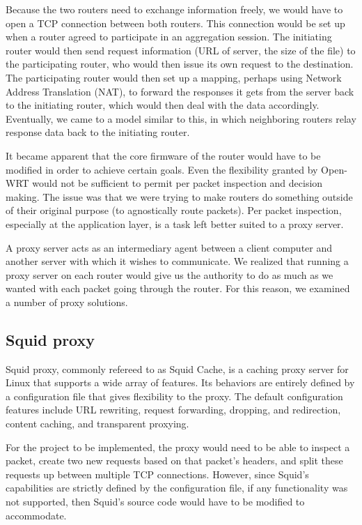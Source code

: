 \documentclass[12pt]{article}
\begin{document}
		Because the two routers need to exchange information freely, we would have to open a TCP connection between both routers. This connection would be set up when a router agreed to participate in an aggregation session. The initiating router would then send request information (URL of server, the size of the file) to the participating router, who would then issue its own request to the destination. The participating router would then set up a mapping, perhaps using Network Address Translation (NAT), to forward the responses it gets from the server back to the initiating router, which would then deal with the data accordingly. Eventually, we came to a model similar to this, in which neighboring routers relay response data back to the initiating router.

		It became apparent that the core firmware of the router would have to be modified in order to achieve certain goals. Even the flexibility granted by Open-WRT would not be sufficient to permit per packet inspection and decision making. The issue was that we were trying to make routers do something outside of their original purpose (to agnostically route packets). Per packet inspection, especially at the application layer, is a task left better suited to a proxy server.




		A proxy server acts as an intermediary agent between a client computer and another server with which it wishes to communicate. We realized that running a proxy server on each router would give us the authority to do as much as we wanted with each packet going through the router. For this reason, we examined a number of proxy solutions. 

		\subsection{Squid proxy}

			Squid proxy, commonly refereed to as Squid Cache, is a caching proxy server for Linux that supports a wide array of features. Its behaviors are entirely defined by a configuration file that gives flexibility to the proxy. The default configuration features include URL rewriting, request forwarding, dropping, and redirection, content caching, and transparent proxying.

			For the project to be implemented, the proxy would need to be able to inspect a packet, create two new requests based on that packet's headers, and split these requests up between multiple TCP connections. However, since Squid's capabilities are strictly defined by the configuration file, if any functionality was not supported, then Squid's source code would have to be modified to accommodate.
\end{document}
